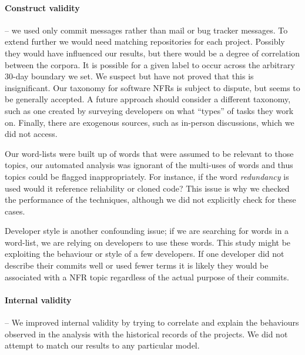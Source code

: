 \documentclass[smallextended]{svjour3}       %
\begin{document}
\paragraph{Construct validity} -- we used only commit messages rather than
mail or bug tracker messages. 
To extend further we would need matching repositories for each project.
Possibly they would have influenced our results, but there would be a degree of correlation between the corpora.
 It is possible for a given label to occur across the arbitrary 30-day boundary we set. We suspect but have not proved that this is insignificant. 
Our taxonomy for software NFRs is subject to dispute, but seems to be
generally accepted.  A future approach should consider a different taxonomy, such as one created by surveying developers on what ``types'' of tasks they work on.
Finally, there are exogenous sources, such as
in-person discussions, which we did not access.  %

Our word-lists were built up of words that were assumed to be relevant
to those topics, our automated analysis was ignorant of the multi-uses
of words and thus topics could be flagged inappropriately. For
instance, if the word \emph{redundancy} is used would it reference
reliability or cloned code? This issue is why we checked the
performance of the techniques, although we did not explicitly check
for these cases.

Developer style is another confounding issue; if we are searching for
words in a word-list, we are relying on developers to use these words. This
study might be exploiting the behaviour or style of a few
developers. If one developer did not describe their commits well or
used fewer terms it is likely they would be associated with a NFR
topic regardless of the actual purpose of their commits.

\paragraph{Internal validity} -- %
We improved internal validity by trying to correlate and explain the behaviours observed in the analysis with the historical records of the projects.
We did not attempt to match our results to any particular model.
\end{document}
